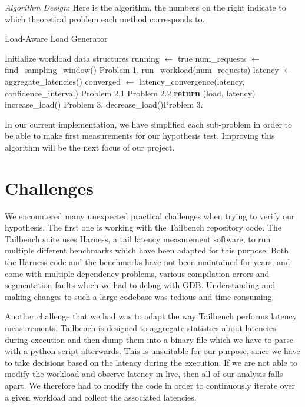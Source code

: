 \documentclass[12pt]{article}
\begin{document}
\vspace{0.5em}
\noindent \textit{Algorithm Design}: Here is the algorithm, the numbers on the right indicate to which theoretical problem each method corresponds to.

\begin{algorithm}
	\caption{Load-Aware Load Generator}\label{alg:cap}
	\begin{algorithmic}[1]
		\STATE Initialize workload data structures
		\STATE running $\gets$ true
		\STATE num\_requests $\gets$ find\_sampling\_window() \hfill Problem 1.
		\STATE run\_workload(num\_requests)
		\STATE latency $\gets$ aggregate\_latencies()
		\STATE converged $\gets$ latency\_convergence(latency, confidence\_interval) \hfill Problem 2.1
		 \hfill Problem 2.2
		\STATE \textbf{return} (load, latency) 
		\STATE increase\_load() \hfill Problem 3.
		\STATE decrease\_load()\hfill Problem 3.
		\ENDIF
		\ENDIF
		\ENDWHILE
	\end{algorithmic}
\end{algorithm}

\noindent In our current implementation, we have simplified each sub-problem in order to be able to make first measurements for our hypothesis test. Improving this algorithm will be the next focus of our project.

\singlespacing


\section{Challenges}

We encountered many unexpected practical challenges when trying to verify our hypothesis. The first one is working with the Tailbench repository code. The Tailbench suite uses Harness, a tail latency measurement software, to run multiple different benchmarks which have been adapted for this purpose. Both the Harness code and the benchmarks have not been maintained for years, and come with multiple dependency problems, various compilation errors and segmentation faults which we had to debug with GDB.  Understanding and making changes to such a large codebase was tedious and time-consuming.

\singlespacing

\noindent Another challenge that we had was to adapt the way Tailbench performs latency measurements. Tailbench is designed to aggregate statistics about latencies during execution and then dump them into a binary file which we have to parse with a python script afterwards. This is unsuitable for our purpose, since we have to take decisions based on the latency during the execution. If we are not able to modify the workload and observe latency in live, then all of our analysis falls apart. We therefore had to modify the code in order to continuously iterate over a given workload and collect the associated latencies.
\end{document}
